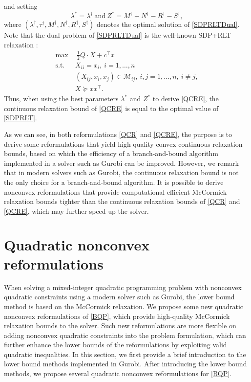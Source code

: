 \documentclass[pdflatex,sn-mathphys-num]{sn-jnl}%
\theoremstyle{thmstyleone}%
\theoremstyle{thmstyletwo}%
\theoremstyle{thmstylethree}%
\begin{document}
and setting
\begin{equation}\label{eq_solution}
	\lambda^\ast=\lambda^\dag~\textrm{and}~Z^\ast= M^\dag +  N^\dag -  R^\dag -  S^\dag,
\end{equation}
where  $(\lambda^\dag,\tau^\dag,M^\dag,N^\dag,R^\dag,S^\dag)$ denotes the optimal solution of \eqref{SDPRLTDual}.
Note that the dual problem of \eqref{SDPRLTDual} is the well-known SDP+RLT relaxation \cite{Anstreicher}:
\begin{equation}\label{SDPRLT}\tag{SDP+RLT}
	\begin{aligned}
		\max ~&~ \frac{1}{2}Q\cdot X+c^\top x\\
		\mbox{s.t.} ~&X_{ii}=x_i,~i=1,\ldots,n\\
		&(X_{ij},x_i,x_j)\in \mathcal{M}_{ij},~i,j=1,\ldots,n,~i\neq j,\\
		&X\succeq xx^\top.
	\end{aligned}
\end{equation}
Thus, when using the best parameters $\lambda^\ast$ and $Z^\ast$ to derive \eqref{QCRE}, the continuous relaxation bound of \eqref{QCRE} is equal to the optimal value of \eqref{SDPRLT}.

As we can see, in both reformulations \eqref{QCR} and \eqref{QCRE}, the purpose is to derive some reformulations that yield high-quality convex continuous relaxation bounds, based on which the efficiency of a branch-and-bound algorithm implemented in a solver such as Gurobi can be improved. However, we remark that in modern solvers such as Gurobi, the continuous relaxation bound is not the only choice for a branch-and-bound algorithm. It is possible to derive nonconvex reformulations that provide computational efficient McCormick relaxation bounds tighter than the continuous relaxation bounds of \eqref{QCR} and \eqref{QCRE}, which may further speed up the solver.



\section{Quadratic nonconvex reformulations}\label{sec3}

When solving a mixed-integer quadratic programming problem with nonconvex quadratic constraints using a modern solver such as Gurobi, the lower bound method is based on the McCormick relaxation. We propose some new quadratic nonconvex reformulations of \eqref{BQP}, which provide high-quality McCormick relaxation bounds to the solver. Such new reformulations are more flexible on adding nonconvex quadratic constraints into the problem formulation, which can further enhance the lower bounds of the reformulations by exploiting valid quadratic inequalities. In this section, we first provide a brief introduction to the lower bound methods implemented in Gurobi. After introducing the lower bound methods, we propose several quadratic nonconvex reformulations for \eqref{BQP}.
\end{document}
